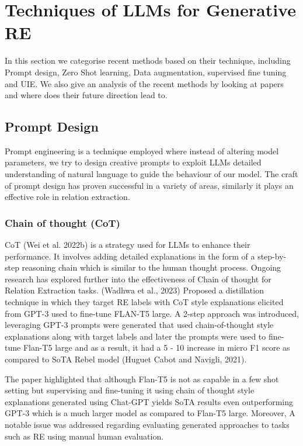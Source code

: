 \documentclass[twocolumn, 11pt]{extarticle}
\begin{document}
\section{Techniques of LLMs for Generative RE}
In this section we categorise recent methods based on their technique, including Prompt design, Zero Shot learning, Data augmentation, supervised fine tuning and UIE. We also give an analysis of the recent methods by looking at papers and where does their future direction lead to.

\subsection{Prompt Design}
Prompt engineering is a technique employed where instead of altering model parameters, we try to design creative prompts to exploit LLMs detailed understanding of natural language to guide the behaviour of our model. The craft of prompt design has proven successful in a variety of areas, similarly it plays an effective role in relation extraction. 


\subsubsection{Chain of thought (CoT)} 
CoT (Wei et al. 2022b) is a strategy used for LLMs to enhance their performance. It involves adding detailed explanations in the form of a step-by-step reasoning chain which is similar to the human thought process. Ongoing research has explored further into the effectiveness of Chain of thought for Relation Extraction tasks. (Wadhwa et al., 2023) Proposed a distillation technique in which they target RE labels with CoT style explanations elicited from GPT-3 used to fine-tune FLAN-T5 large. A 2-step approach was introduced, leveraging GPT-3 prompts were generated that used chain-of-thought style explanations along with target labels and later the prompts were used to fine-tune Flan-T5 large and as a result, it had a 5 - 10 increase in micro F1 score as compared to SoTA Rebel model (Huguet Cabot and Navigli, 2021).

The paper highlighted that although Flan-T5 is not as capable in a few shot setting but supervising and fine-tuning it using chain of thought style explanations generated using Chat-GPT yields SoTA results even outperforming GPT-3 which is a much larger model as compared to Flan-T5 large. Moreover, A notable issue was addressed regarding evaluating generated approaches to tasks such as RE using manual human evaluation.
\end{document}
